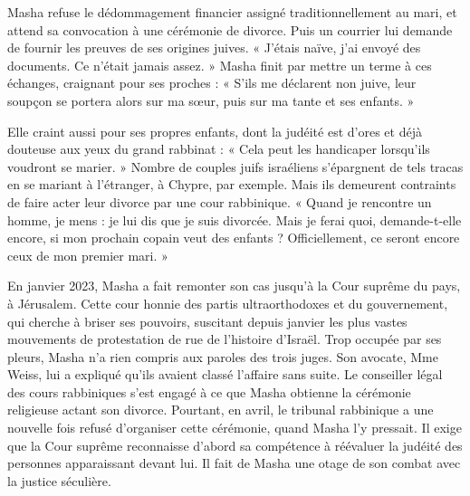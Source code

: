 Masha refuse le dédommagement financier assigné traditionnellement au mari, et attend sa convocation à une cérémonie de divorce. Puis un courrier lui demande de fournir les preuves de ses origines juives. « J’étais naïve, j’ai envoyé des documents. Ce n’était jamais assez. » Masha finit par mettre un terme à ces échanges, craignant pour ses proches : « S’ils me déclarent non juive, leur soupçon se portera alors sur ma sœur, puis sur ma tante et ses enfants. »

Elle craint aussi pour ses propres enfants, dont la judéité est d’ores et déjà douteuse aux yeux du grand rabbinat : « Cela peut les handicaper lorsqu’ils voudront se marier. » Nombre de couples juifs israéliens s’épargnent de tels tracas en se mariant à l’étranger, à Chypre, par exemple. Mais ils demeurent contraints de faire acter leur divorce par une cour rabbinique. « Quand je rencontre un homme, je mens : je lui dis que je suis divorcée. Mais je ferai quoi, demande-t-elle encore, si mon prochain copain veut des enfants ? Officiellement, ce seront encore ceux de mon premier mari. »

En janvier 2023, Masha a fait remonter son cas jusqu’à la Cour suprême du pays, à Jérusalem. Cette cour honnie des partis ultraorthodoxes et du gouvernement, qui cherche à briser ses pouvoirs, suscitant depuis janvier les plus vastes mouvements de protestation de rue de l’histoire d’Israël. Trop occupée par ses pleurs, Masha n’a rien compris aux paroles des trois juges. Son avocate, Mme Weiss, lui a expliqué qu’ils avaient classé l’affaire sans suite. Le conseiller légal des cours rabbiniques s’est engagé à ce que Masha obtienne la cérémonie religieuse actant son divorce. Pourtant, en avril, le tribunal rabbinique a une nouvelle fois refusé d’organiser cette cérémonie, quand Masha l’y pressait. Il exige que la Cour suprême reconnaisse d’abord sa compétence à réévaluer la judéité des personnes apparaissant devant lui. Il fait de Masha une otage de son combat avec la justice séculière.

